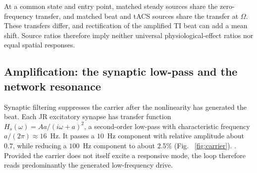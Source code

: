 \documentclass[11pt,a4paper]{article}
\providecommand{\DIFaddtex}[1]{{\protect\color{blue} \sf #1}} %
\providecommand{\DIFdeltex}[1]{{\protect\color{red} \scriptsize #1}} %
\providecommand{\DIFaddbegin}{} %
\providecommand{\DIFaddend}{} %
\providecommand{\DIFdelbegin}{} %
\providecommand{\DIFdelend}{} %
\providecommand{\DIFadd}[1]{\texorpdfstring{\DIFaddtex{#1}}{#1}} %
\providecommand{\DIFdel}[1]{\texorpdfstring{\DIFdeltex{#1}}{}} %
\begin{document}
\DIFadd{At a common state and entry point, matched steady sources share the
zero-frequency transfer, and matched beat and tACS sources share the transfer
at $\Omega$. These transfers differ, and rectification of the amplified TI
beat can add a mean shift.
Source ratios therefore imply neither universal physiological-effect ratios
nor equal spatial responses.
}

\DIFaddend \subsection{Amplification: the synaptic low-pass and the network resonance}\label{sec:carrier}
Synaptic filtering suppresses the carrier after the nonlinearity has generated
the beat. Each JR excitatory synapse has transfer function
$H_s(\omega)=Aa/(i\omega+a)^2$, a second-order low-pass with characteristic
frequency $a/(2\pi)\approx16$~Hz. It passes a $10$~Hz component with relative
amplitude about $0.7$, while reducing a $100$~Hz component to about $2.5\%$\DIFdelbegin \DIFdel{(Fig. ~\ref{fig:carrier}). }\DIFdelend \DIFaddbegin \DIFadd{. }\DIFaddend Provided the carrier does not itself excite a responsive
mode, the loop therefore reads predominantly the generated low-frequency drive.

\end{document}
